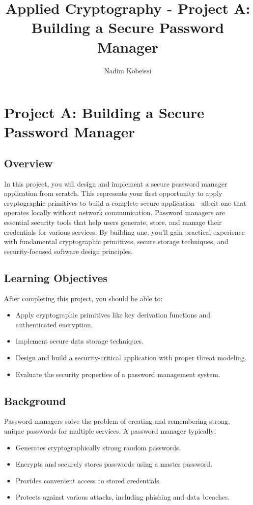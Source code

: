 \documentclass[10pt,a4paper,american]{exam}
\title{Applied Cryptography - Project A: Building a Secure Password Manager}
\author{Nadim Kobeissi}
\begin{document}
\classhandoutheader
\section*{Project A: Building a Secure Password Manager}

\subsection*{Overview}
In this project, you will design and implement a secure password manager application from scratch. This represents your first opportunity to apply cryptographic primitives to build a complete secure application—albeit one that operates locally without network communication. Password managers are essential security tools that help users generate, store, and manage their credentials for various services. By building one, you'll gain practical experience with fundamental cryptographic primitives, secure storage techniques, and security-focused software design principles.

\subsection*{Learning Objectives}
After completing this project, you should be able to:
\begin{itemize}
	\item Apply cryptographic primitives like key derivation functions and authenticated encryption.
	\item Implement secure data storage techniques.
	\item Design and build a security-critical application with proper threat modeling.
	\item Evaluate the security properties of a password management system.
\end{itemize}

\subsection*{Background}
Password managers solve the problem of creating and remembering strong, unique passwords for multiple services. A password manager typically:
\begin{itemize}
	\item Generates cryptographically strong random passwords.
	\item Encrypts and securely stores passwords using a master password.
	\item Provides convenient access to stored credentials.
	\item Protects against various attacks, including phishing and data breaches.
\end{itemize}
\end{document}
